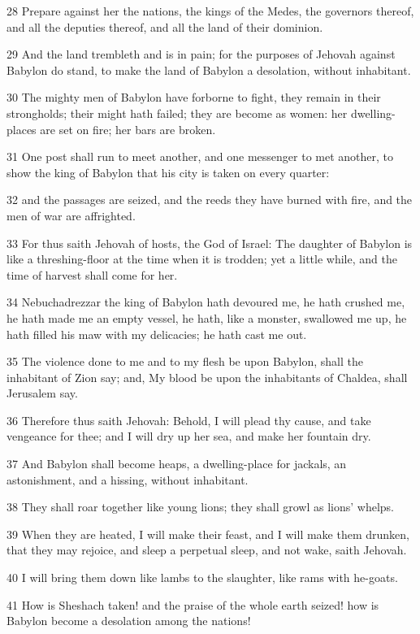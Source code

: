 \par 28 Prepare against her the nations, the kings of the Medes, the governors thereof, and all the deputies thereof, and all the land of their dominion.
\par 29 And the land trembleth and is in pain; for the purposes of Jehovah against Babylon do stand, to make the land of Babylon a desolation, without inhabitant.
\par 30 The mighty men of Babylon have forborne to fight, they remain in their strongholds; their might hath failed; they are become as women: her dwelling-places are set on fire; her bars are broken.
\par 31 One post shall run to meet another, and one messenger to met another, to show the king of Babylon that his city is taken on every quarter:
\par 32 and the passages are seized, and the reeds they have burned with fire, and the men of war are affrighted.
\par 33 For thus saith Jehovah of hosts, the God of Israel: The daughter of Babylon is like a threshing-floor at the time when it is trodden; yet a little while, and the time of harvest shall come for her.
\par 34 Nebuchadrezzar the king of Babylon hath devoured me, he hath crushed me, he hath made me an empty vessel, he hath, like a monster, swallowed me up, he hath filled his maw with my delicacies; he hath cast me out.
\par 35 The violence done to me and to my flesh be upon Babylon, shall the inhabitant of Zion say; and, My blood be upon the inhabitants of Chaldea, shall Jerusalem say.
\par 36 Therefore thus saith Jehovah: Behold, I will plead thy cause, and take vengeance for thee; and I will dry up her sea, and make her fountain dry.
\par 37 And Babylon shall become heaps, a dwelling-place for jackals, an astonishment, and a hissing, without inhabitant.
\par 38 They shall roar together like young lions; they shall growl as lions' whelps.
\par 39 When they are heated, I will make their feast, and I will make them drunken, that they may rejoice, and sleep a perpetual sleep, and not wake, saith Jehovah.
\par 40 I will bring them down like lambs to the slaughter, like rams with he-goats.
\par 41 How is Sheshach taken! and the praise of the whole earth seized! how is Babylon become a desolation among the nations!
